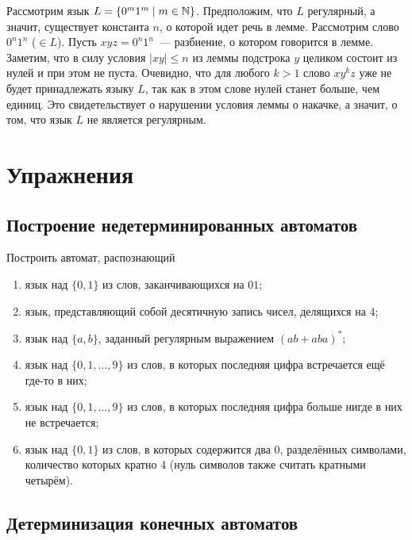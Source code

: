 \begin{myexample}
Рассмотрим язык $L= \{ 0^m1^m \mid m \in \mathbb N\}$. Предположим, что $L$ регулярный,
а значит, существует константа $n$, о которой идет речь в лемме.
Рассмотрим слово $0^n1^n$ ($\in L$). Пусть $xyz = 0^n1^n$~--- разбиение,
о котором говорится в лемме. Заметим, что в силу условия $|xy| \le n$
из леммы подстрока $y$ целиком состоит из нулей и при этом не пуста.
Очевидно, что для любого $k > 1$ слово $xy^kz$ уже не будет принадлежать
языку $L$, так как в этом слове нулей станет больше, чем единиц. Это свидетельствует о нарушении условия леммы о накачке, а значит, о том, что язык $L$
не является регулярным.
\end{myexample}

\section{Упражнения}
\label{Chapter3Exs}

\subsection*{Построение недетерминированных автоматов}

Построить автомат, распознающий
\begin{enumerate}
  \item язык над $\{0,1\}$ из слов, заканчивающихся на $01$;
  \item язык, представляющий собой десятичную запись чисел, делящихся на $4$;
  \item язык над $\{a, b\}$, заданный регулярным выражением $(ab + aba)^\ast$;
  \item язык над $\{0, 1, \ldots , 9\}$ из слов, в которых последняя цифра
  встречается ещё где-то в них;
  \item язык над $\{0, 1, \ldots , 9\}$ из слов, в которых последняя цифра
  больше нигде в них не встречается;
  \item язык над $\{0,1\}$ из слов, в которых содержится два $0$, разделённых
  символами, количество которых кратно $4$ (нуль символов также считать
  кратными четырём).
\end{enumerate}

\subsection*{Детерминизация конечных автоматов}

